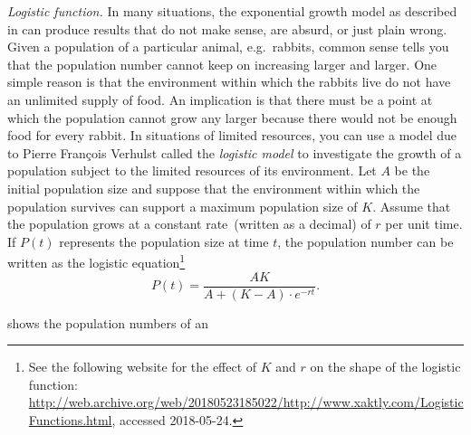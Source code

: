 \documentclass[a4paper,oneside,12pt]{article}
\begin{document}
\begin{problem}
\begin{table}[!htbp]
\centering

\caption{%
  The observed population size in an experimental colony of yeast.
  The data are due to T.~Carlson, published in~1913.  The ``Hour''
  column lists the number of hours that the population had been
  allowed to grow.  The ``Observed'' column lists the count of the
  number of yeast cells that were found in the colony after a given
  number of hours.
}
\label{tab:exponential:yeast}
\end{table}

\item\emph{Logistic function.}
  In many situations, the exponential growth model as described
  in  can produce results
  that do not make sense, are absurd, or just plain wrong.  Given a
  population of a particular animal, e.g.~rabbits, common sense tells
  you that the population number cannot keep on increasing larger and
  larger.  One simple reason is that the environment within which the
  rabbits live do not have an unlimited supply of food.  An
  implication is that there must be a point at which the population
  cannot grow any larger because there would not be enough food for
  every rabbit.  In situations of limited resources, you can use a
  model due to Pierre Fran\c{c}ois Verhulst called the
  \emph{logistic model} to investigate the growth of a population
  subject to the limited resources of its environment.  Let $A$ be the
  initial population size and suppose that the environment within
  which the population survives can support a maximum population size
  of $K$.  Assume that the population grows at a constant
  rate~(written as a decimal) of $r$ per unit time.  If $P(t)$
  represents the population size at time $t$, the population number
  can be written as the logistic equation\footnote{
    See the following website for the effect of $K$ and $r$ on the
    shape of the logistic function:
    \url{http://web.archive.org/web/20180523185022/http://www.xaktly.com/LogisticFunctions.html},
    accessed 2018-05-24.
  }
  \begin{equation}
  \label{eqn:exponential:logistic_equation}
  P(t)
  =
  \frac{
    AK
  }{
    A + (K - A) \cdot e^{-rt}
  }.
  \end{equation}
  \begin{packedenum}
  \item\label{subprob:exponential:yeast_data_mean_growth_factor}
     shows the population numbers of an

\end{packedenum}
\end{problem}
\end{document}
